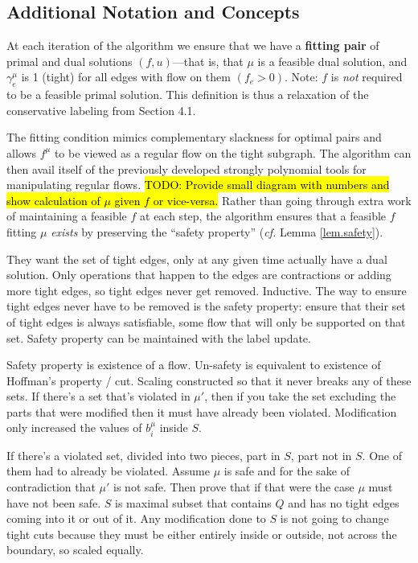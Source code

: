\documentclass[11pt]{article}
\theoremstyle{definition}
\theoremstyle{definition}
\newcommand{\biu}{b_{i}^{\mu}}
\newcommand{\todo}[1]{\hl{TODO: #1}}
\begin{document}
    \subsection{Additional Notation and Concepts}
	At each iteration of the algorithm we ensure that we have a \textbf{fitting pair}
	of primal and dual solutions $(f,u)$---that is, that $\mu$ is a feasible dual solution,
	and $\gamma_e^{\mu}$ is 1 (tight) for all edges with flow on them $(f_e > 0)$. Note: $f$ is
	\emph{not} required to be a feasible primal solution. This definition is thus a relaxation of the
	conservative labeling from Section 4.1.
	
	The fitting condition mimics complementary
	slackness for optimal pairs and allows $f^\mu$ to be viewed as a regular flow
	on the tight subgraph. The algorithm can then avail itself of the previously developed
	strongly polynomial tools for manipulating regular flows.
	\todo{Provide small diagram with numbers and show calculation of $\mu$ given $f$ or vice-versa.}
	Rather than going through extra work of maintaining a feasible $f$ at each step,
	the algorithm ensures that a feasible $f$ fitting $\mu$ \textit{exists} by preserving the
	``safety property'' (\emph{cf.} Lemma \ref{lem.safety}). 
	
	They want the set of tight edges, only at any given time actually have a dual solution. Only operations that happen to the edges are contractions or adding more tight edges, so tight edges never get removed. Inductive. The way to ensure tight edges never have to be removed is the safety property: ensure that their set of tight edges is always satisfiable, some flow that will only be supported on that set. Safety property can be maintained with the label update. 
	
	Safety property is existence of a flow. Un-safety is equivalent to existence of Hoffman's property / cut. Scaling constructed so that it never breaks any of these sets. If there's a set that's violated in $\mu'$, then if you take the set excluding the parts that were modified then it must have already been violated. Modification only increased the values of $\biu$ inside $S$.
	
	If there's a violated set, divided into two pieces, part in $S$, part not in $S$. One of them had to already be violated. Assume $\mu$ is safe and for the sake of contradiction that $\mu'$ is not safe. Then prove that if that were the case $\mu$ must have not been safe. 
	$S$ is maximal subset that contains $Q$ and has no tight edges coming into it or out of it. Any modification done to $S$ is not going to change tight cuts because they must be either entirely inside or outside, not across the boundary, so scaled equally. 
	
\end{document}
